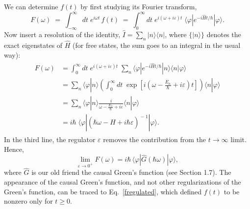 \documentclass[pra,12pt]{revtex4}
\begin{document}
We can determine $f(t)$ by first studying its Fourier transform,
\begin{equation}
  F(\omega) \;=\; \int_{-\infty}^\infty dt \; e^{i\omega t}\, f(t) \;=\; \int_0^\infty dt \; e^{i(\omega + i\varepsilon) t} \; \langle\varphi|e^{-i\hat{H}t/\hbar}|\varphi\rangle.
\end{equation}
Now insert a resolution of the identity, $\hat{I} = \sum_n
|n\rangle\langle n|$, where $\{|n\rangle\}$ denotes the exact
eigenstates of $\hat{H}$ (for free states, the sum goes to an integral
in the usual way):
\begin{align}
  \begin{aligned}F(\omega) &= \int_0^\infty dt \; e^{i(\omega + i\varepsilon) t} \; \sum_n \langle\varphi|e^{-i\hat{H}t/\hbar}|n\rangle\langle n|\varphi\rangle \\ &= \sum_n \langle\varphi|n\rangle \left( \int_0^\infty dt \; \exp\left[i\left(\omega - \frac{E_n}{\hbar} + i\varepsilon\right) t\right] \right) \langle n|\varphi\rangle \\ &= \sum_n \langle\varphi|n\rangle \frac{i}{\omega - \frac{E_n}{\hbar} + i \varepsilon} \langle n|\varphi\rangle \\ &= i \hbar\; \langle \varphi | \left(\hbar\omega - \hat{H} + i\hbar\varepsilon \right)^{\!-1} | \varphi\rangle. \end{aligned}
\end{align}
In the third line, the regulator $\varepsilon$ removes the
contribution from the $t \rightarrow\infty$ limit.  Hence,
\begin{equation}
  \lim_{\varepsilon \rightarrow 0^+} F(\omega) = i \hbar \, \langle \varphi | \hat{G}(\hbar\omega) | \varphi\rangle,
\end{equation}
where $\hat{G}$ is our old friend the causal Green's function (see
Section 1.7).  The appearance of the causal Green's function, and not
other regularizations of the Green's function, can be traced to
Eq.~\eqref{fregulated}, which defined $f(t)$ to be nonzero only for $t
\ge 0$.
\end{document}
